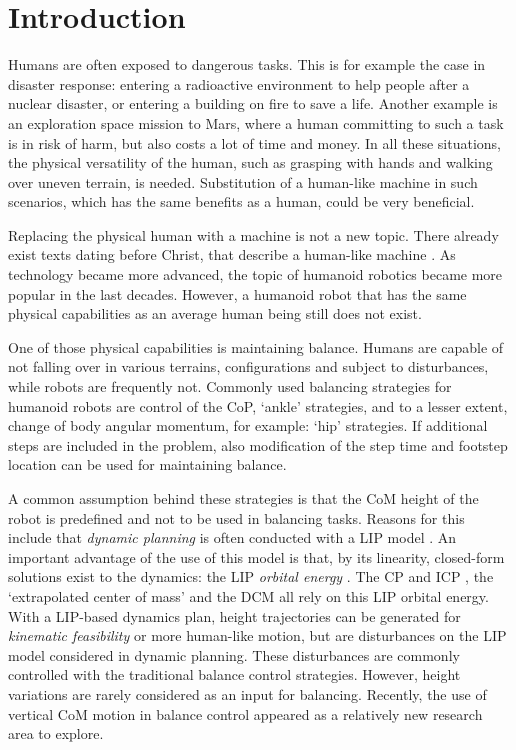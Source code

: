 %
\chapter{Introduction} \label{chap::intro}
Humans are often exposed to dangerous tasks. This is for example the case in disaster response: entering a radioactive environment to help people after a nuclear disaster, or entering a building on fire to save a life. Another example is an exploration space mission to Mars, where a human committing to such a task is in risk of harm, but also costs a lot of time and money. In all these situations, the physical versatility of the human, such as grasping with hands and walking over uneven terrain, is needed. Substitution of a human-like machine in such scenarios, which has the same benefits as a human, could be very beneficial. 

Replacing the physical human with a machine is not a new topic. There already exist texts dating before Christ, that describe a human-like machine \cite{behnke2008humanoid}. As technology became more advanced, the topic of humanoid robotics became more popular in the last decades. However, a humanoid robot that has the same physical capabilities as an average human being still does not exist. 

One of those physical capabilities is maintaining balance. Humans are capable of not falling over in various terrains, configurations and subject to disturbances, while robots are frequently not. Commonly used balancing strategies for humanoid robots are control of the \ac{CoP}, `ankle' strategies, and to a lesser extent, change of body angular momentum, for example: `hip' strategies. If additional steps are included in the problem, also modification of the step time and footstep location can be used for maintaining balance. 

A common assumption behind these strategies is that the \ac{CoM} height of the robot is predefined and not to be used in balancing tasks. Reasons for this include that \textit{dynamic planning} is often conducted with a \ac{LIP} model \cite{kajita20013d}. An important advantage of the use of this model is that, by its linearity, closed-form solutions exist to the dynamics: the \ac{LIP} \textit{orbital energy} \cite{kajita1992dynamic}. The \ac{CP} \cite{pratt2006capture} and \ac{ICP} \cite{koolen2012capturability}, the `extrapolated center of mass' \cite{hof2008extrapolated} and the \ac{DCM} \cite{takenaka2009real} all rely on this \ac{LIP} orbital energy. With a \ac{LIP}-based dynamics plan, height trajectories can be generated for \textit{kinematic feasibility} or more human-like motion, but are disturbances on the \ac{LIP} model considered in dynamic planning. These disturbances are commonly controlled with the traditional balance control strategies. However, height variations are rarely considered as an input for balancing. Recently, the use of vertical \ac{CoM} motion in balance control appeared as a relatively new research area to explore.

